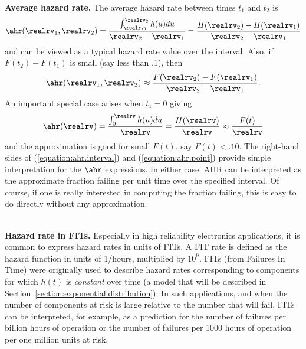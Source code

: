 \mbox{  }\\
\noindent
{\bf Average hazard rate.}
The average hazard rate between times $t_{1}$ and $t_{2}$ is
\begin{displaymath}
\ahr(\realrv_{1},\realrv_{2})=\frac{
	\int_{\realrv_{1}}^{\realrv_{2}} h(u) du
         }
	{
	\realrv_{2}-\realrv_{1} 
	} =\frac{
	H(\realrv_{2})-H(\realrv_{1})
         }
	{
	\realrv_{2}-\realrv_{1} 
	}
\end{displaymath}
and can be viewed as a typical hazard rate value over the interval.
Also, if $F(t_{2})-F(t_{1})$ is small (say less than .1), then
\begin{equation}
\label{equation:ahr.interval}
\ahr(\realrv_{1},\realrv_{2}) \approx \frac{
F({\realrv_{2}}) - F({\realrv_{1}})
         }
	{
	\realrv_{2}-\realrv_{1}
	}.
\end{equation}
An important special case arises when $t_{1}=0$ giving
\begin{equation}
\label{equation:ahr.point}
\ahr(\realrv)=\frac{
	\int_{0}^{\realrv} h(u) du
         }
	{
	\realrv
	} =\frac{
	H(\realrv)
         }
	{
	\realrv
	} \approx \frac{
F(t)
         }
	{
	\realrv
	}
\end{equation}
and the approximation is good for small $F(t)$, say $F(t)<.10$. 
The right-hand sides
of (\ref{equation:ahr.interval}) and (\ref{equation:ahr.point})
provide simple interpretation for the $\ahr$ expressions. In either
case, AHR can be interpreted as the approximate fraction failing per
unit time over the specified interval. Of course, if one is really
interested in computing the fraction failing, this is easy to do
directly without any approximation.

\mbox{  }\\
\noindent
{\bf Hazard rate in FITs.}
Especially in high reliability electronics applications, it is common
to express hazard rates in units of FITs. A FIT rate
is defined as the hazard function in units of 1/hours, multiplied
by $10^{9}$.  FITs (from Failures
In Time) were originally
used to describe hazard rates corresponding to components for which
$h(t)$ is {\em constant} over time (a model that will be described in
Section~\ref{section:exponential.distribution}). In such applications,
and when the number of components at risk is large relative to the
number that will fail, FITs can be interpreted, for example, as a
prediction for the number of failures per billion hours of operation
or the number of failures per 1000 hours of operation per one million
units at risk.

